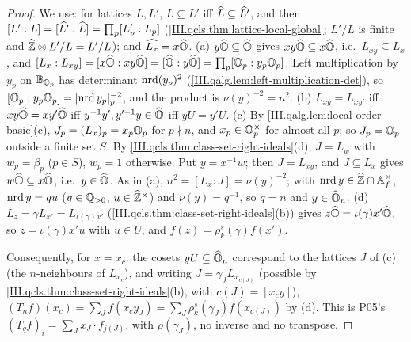 \begin{theorem}
\end{theorem}
\begin{proof}
We use: for lattices $L,L'$, $L\subseteq L'$ iff $\widehat{L}\subseteq\widehat{L'}$, and then $[L':L]=[\widehat{L'}:\widehat{L}]=\prod_p[L'_p:L_p]$
(\cref{III.qcls.thm:lattice-local-global}; $L'/L$ is finite and $\widehat{\mathbb{Z}}\otimes L'/L=L'/L$); and $\widehat{L_x}=x\widehat{\mathbb{O}}$. (a) $y\widehat{\mathbb{O}}\subseteq\widehat{\mathbb{O}}$ gives
$xy\widehat{\mathbb{O}}\subseteq x\widehat{\mathbb{O}}$, i.e.\ $L_{xy}\subseteq L_x$, and $[L_x:L_{xy}]=[x\widehat{\mathbb{O}}:xy\widehat{\mathbb{O}}]=[\widehat{\mathbb{O}}:y\widehat{\mathbb{O}}]=\prod_p[\mathbb{O}_p:y_p\mathbb{O}_p]$. Left multiplication by
$y_p$ on $\mathbb{B}_{\mathbb{Q}_p}$ has determinant $\operatorname{nrd}(y_p)^2$ (\cref{III.qalg.lem:left-multiplication-det}), so $[\mathbb{O}_p:y_p\mathbb{O}_p]=\lvert\operatorname{nrd} y_p\rvert_p^{-2}$, and the product
is $\nu(y)^{-2}=n^2$. (b) $L_{xy}=L_{xy'}$ iff $xy\widehat{\mathbb{O}}=xy'\widehat{\mathbb{O}}$ iff $y^{-1}y',y'^{-1}y\in\widehat{\mathbb{O}}$ iff $yU=y'U$. (c) By
\cref{III.qalg.lem:local-order-basic}(c), $J_p=(L_x)_p=x_p\mathbb{O}_p$ for $p\nmid n$, and $x_p\in\mathbb{O}_p^\times$ for almost all $p$; so $J_p=\mathbb{O}_p$ outside a
finite set $S$. By \cref{III.qcls.thm:class-set-right-ideals}(d), $J=L_w$ with $w_p=\beta_p$ ($p\in S$), $w_p=1$ otherwise. Put $y=x^{-1}w$; then
$J=L_{xy}$, and $J\subseteq L_x$ gives $w\widehat{\mathbb{O}}\subseteq x\widehat{\mathbb{O}}$, i.e.\ $y\in\widehat{\mathbb{O}}$. As in (a), $n^2=[L_x:J]=\nu(y)^{-2}$; with $\operatorname{nrd} y\in\widehat{\mathbb{Z}}\cap\mathbb{A}_f^\times$,
$\operatorname{nrd} y=q u$ ($q\in\mathbb{Q}_{>0}$, $u\in\widehat{\mathbb{Z}}^\times$) and $\nu(y)=q^{-1}$, so $q=n$ and $y\in\widehat{\mathbb{O}}_n$. (d) $L_z=\gamma L_{x'}=L_{\iota(\gamma)x'}$
(\cref{III.qcls.thm:class-set-right-ideals}(b)) gives $z\widehat{\mathbb{O}}=\iota(\gamma)x'\widehat{\mathbb{O}}$, so $z=\iota(\gamma)x'u$ with $u\in U$, and $f(z)=\rho_k^s(\gamma)f(x')$.

Consequently, for $x=x_c$: the cosets $yU\subseteq\widehat{\mathbb{O}}_n$ correspond to the lattices $J$ of (c) (the $n$-neighbours of $L_{x_c}$), and writing
$J=\gamma_JL_{x_{c(J)}}$ (possible by \cref{III.qcls.thm:class-set-right-ideals}(b), with $c(J)=[x_cy]$), $(T_nf)(x_c)=\sum_Jf(x_cy_J)=\sum_J\rho_k^s(\gamma_J)f(x_{c(J)})$ by
(d). This is P05's $(T_qf)_i=\sum_Jx_J\cdot f_{j(J)}$, with $\rho(\gamma_J)$, no inverse and no transpose.
\end{proof}

